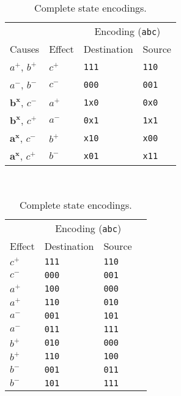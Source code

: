 \begin{table}[ht]
\hfill
\begin{minipage}[]{.38\textwidth}
\centering
\caption{Partial state encodings.}\label{tab:enc}
\begin{tabular}{@{}llll@{}}
	\toprule
	& & \multicolumn{2}{c}{Encoding (\texttt{abc})}\\ \cmidrule(l){3-4}
	Causes & Effect & Destination & Source\\ \midrule
	$a^{+}$, $b^{+}$		& $c^{+}$ & \texttt{111} & \texttt{110}\\
	$a^{-}$, $b^{-}$ 		& $c^{-}$ & \texttt{000} & \texttt{001}\\
	$\mathbf{b^{x}}$, $c^{-}$	& $a^{+}$ & \texttt{1x0} & \texttt{0x0}\\
	$\mathbf{b^{x}}$, $c^{+}$	& $a^{-}$ & \texttt{0x1} & \texttt{1x1}\\
	$\mathbf{a^{x}}$, $c^{-}$	& $b^{+}$ & \texttt{x10} & \texttt{x00}\\
	$\mathbf{a^{x}}$, $c^{+}$	& $b^{-}$ & \texttt{x01} & \texttt{x11}\\
	\bottomrule
\end{tabular}
\\
\caption{Complete state encodings.}\label{tab:enc_complete}
\begin{tabular}{@{}llll@{}}
	\toprule
	& \multicolumn{2}{c}{Encoding (\texttt{abc})}\\ \cmidrule(l){2-3}
	Effect & Destination & Source\\ \midrule
	$c^{+}$ & \texttt{111} & \texttt{110}\\[0.25em]
	$c^{-}$ & \texttt{000} & \texttt{001}\\[0.25em]
	$a^{+}$ & \texttt{100} & \texttt{000}\\
	$a^{+}$ & \texttt{110} & \texttt{010}\\[0.25em]
	$a^{-}$ & \texttt{001} & \texttt{101}\\
	$a^{-}$ & \texttt{011} & \texttt{111}\\[0.25em]
	$b^{+}$ & \texttt{010} & \texttt{000}\\
	$b^{+}$ & \texttt{110} & \texttt{100}\\[0.25em]
	$b^{-}$ & \texttt{001} & \texttt{011}\\
	$b^{-}$ & \texttt{101} & \texttt{111}\\
	\bottomrule
\end{tabular}
\end{minipage}
\hfill
\begin{minipage}[]{.58\textwidth}

\end{minipage}
\end{table}
